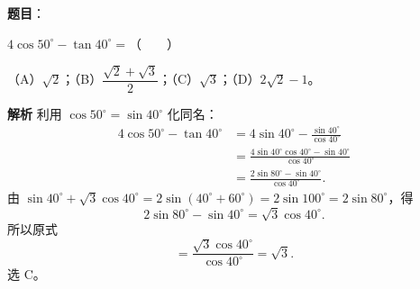 \begin{answer}

\textbf{题目}：

$4\cos50^\circ-\tan40^\circ=$\mbox{（　　）}

（A）$\sqrt2$；（B）$\dfrac{\sqrt2+\sqrt3}2$；（C）$\sqrt3$；（D）$2\sqrt2-1$。

\textbf{解析}
利用 $\cos50^\circ=\sin40^\circ$ 化同名：
\nopagebreak[4]
\[\begin{aligned}
4\cos50^\circ-\tan40^\circ
&=4\sin40^\circ-\frac{\sin40^\circ}{\cos40^\circ}\\
&=\frac{4\sin40^\circ\cos40^\circ-\sin40^\circ}{\cos40^\circ}\\
&=\frac{2\sin80^\circ-\sin40^\circ}{\cos40^\circ}.
\end{aligned}\]
由 $\sin40^\circ+\sqrt3\cos40^\circ=2\sin(40^\circ+60^\circ)=2\sin100^\circ=2\sin80^\circ$，得
\nopagebreak[4]
\[2\sin80^\circ-\sin40^\circ=\sqrt3\cos40^\circ.\]
所以原式
\nopagebreak[4]
\[=\frac{\sqrt3\cos40^\circ}{\cos40^\circ}=\sqrt3.\]
选 C。


\end{answer}
